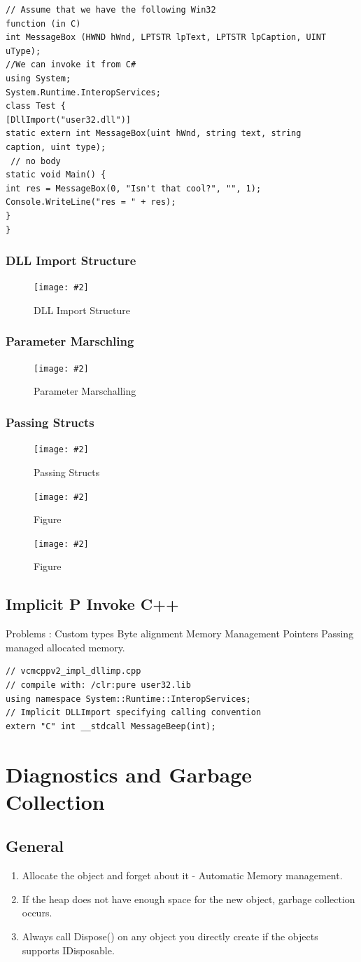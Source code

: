\documentclass[a4paper,10pt]{scrartcl}
\newcommand{\pic}[2][Figure]{
  \begin{figure}[h!]
   \centering
   \texttt{[image: \#2]}
   \caption{{#1}}
  \end{figure}
}
\begin{document}
\begin{lstlisting}[caption=Explicit PInvoke example]
// Assume that we have the following Win32
function (in C)
int MessageBox (HWND hWnd, LPTSTR lpText, LPTSTR lpCaption, UINT
uType);
//We can invoke it from C#
using System;
System.Runtime.InteropServices;
class Test {
[DllImport("user32.dll")]
static extern int MessageBox(uint hWnd, string text, string
caption, uint type);
 // no body
static void Main() {
int res = MessageBox(0, "Isn't that cool?", "", 1);
Console.WriteLine("res = " + res);
}
}

\end{lstlisting}

\subsubsection{DLL Import Structure}
\pic[DLL Import Structure]{dllimport.png}

\subsubsection{Parameter Marschling}
\pic[Parameter Marschalling]{pm.png}

\subsubsection{Passing Structs}
\pic[Passing Structs]{pstructs1.png}
\pic{pstructs2.png}
\pic{pstructs3.png}

\subsection{Implicit P Invoke C++}

Problems : Custom types Byte alignment  Memory Management Pointers Passing managed allocated memory.
\begin{lstlisting}[caption=Implicit PInvoke]
 // vcmcppv2_impl_dllimp.cpp
// compile with: /clr:pure user32.lib
using namespace System::Runtime::InteropServices;
// Implicit DLLImport specifying calling convention
extern "C" int __stdcall MessageBeep(int);

\end{lstlisting}

\section{Diagnostics and Garbage Collection}

\subsection{General}
\begin{enumerate}
 \item Allocate the object and forget about it - Automatic Memory management.
 \item If the heap does not have enough space for the new object, garbage collection occurs.
 \item Always call Dispose() on any object you directly create if the objects supports IDisposable.

\end{enumerate}
\end{document}
